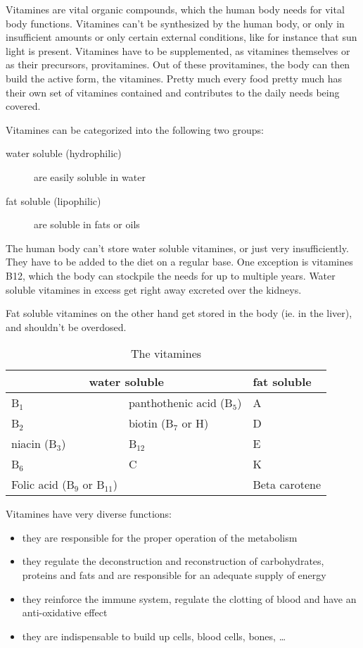 \documentclass[../main.tex]{subfiles}
\begin{document}
Vitamines are vital organic compounds, which the human body needs for vital body functions.
Vitamines can't be synthesized by the human body, or only in insufficient amounts or only certain external conditions,
like for instance that sun light is present.
Vitamines have to be supplemented, as vitamines themselves or as their precursors, provitamines.
Out of these provitamines, the body can then build the active form, the vitamines.
Pretty much every food pretty much has their own set of vitamines contained and contributes to the daily needs being covered.

Vitamines can be categorized into the following two groups:
\begin{description}
\item[water soluble (hydrophilic)] are easily soluble in water
  \item[fat soluble (lipophilic)] are soluble in fats or oils
  \end{description}

  The human body can't store water soluble vitamines, or just very insufficiently.
  They have to be added to the diet on a regular base.
  One exception is vitamines B12, which the body can stockpile the needs for up to multiple years.
  Water soluble vitamines in excess get right away excreted over the kidneys.

  Fat soluble vitamines on the other hand get stored in the body (ie. in the liver), and shouldn't be overdosed.

  \begin{table}[htb!]
    \centering
    \begin{tabular}[t]{ll|l}
      \multicolumn{2}{c}{\textbf{water soluble}} & \textbf{fat soluble} \\
      \hline
      B$_1$ & panthothenic acid (B$_5$) & A \\
      B$_2$ & biotin (B$_7$ or H) & D \\
      niacin (B$_3$) & B$_{12}$ & E \\
      B$_6$ & C & K \\
      Folic acid (B$_9$ or B$_{11}$) & & Beta carotene\\
    \end{tabular}
    \caption{The vitamines}
  \end{table}

  Vitamines have very diverse functions:
  \begin{itemize}
  \item they are responsible for the proper operation of the metabolism
  \item they regulate the deconstruction and reconstruction of carbohydrates, proteins and fats and are responsible for an adequate supply of energy
  \item they reinforce the immune system, regulate the clotting of blood and have an anti-oxidative effect
    \item they are indispensable to build up cells, blood cells, bones, \ldots
    \end{itemize}
\end{document}
